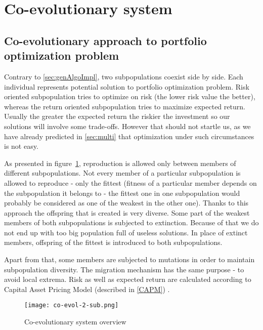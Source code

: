 \section{Co-evolutionary system}
\label{sec:co-evol-sys}

\subsection{Co-evolutionary approach to portfolio optimization problem}

Contrary to \ref{sec:genAlgoImpl}, two subpopulations coexist side by side.
Each individual represents potential solution to portfolio optimization problem.
Risk oriented subpopulation tries to optimize on risk (the lower risk value the better), whereas the return oriented subpopulation tries to maximize expected return.
Usually the greater the expected return the riskier the investment so our solutions will involve some trade-offs.
However that should not startle us, as we have already predicted in \ref{sec:multi} that optimization under such circumstances is not easy.

As presented in figure~\ref{fig:co-evol}, reproduction is allowed only between members of different subpopulations.
Not every member of a particular subpopulation is allowed to reproduce - only the fittest (fitness of a particular member depends on the subpopulation it belongs to - the fittest one
 in one subpopulation would probably be considered as one of the weakest in the other one).
Thanks to this approach the offspring that is created is very diverse. 
Some part of the weakest members of both subpopulations is subjected to extinction.
Because of that we do not end up with too big population full of useless solutions.
In place of extinct members, offspring of the fittest is introduced to both subpopulations.

Apart from that, some members are subjected to mutations in order to maintain subpopulation diversity.
The migration mechanism has the same purpose - to avoid local extrema.
Risk as well as expected return are calculated according to Capital Asset Pricing Model (described in \ref{CAPM}) .


\begin{figure}[ht]  
	    \begin{center}
	      \texttt{[image: co-evol-2-sub.png]}
	    \end{center}
	    \caption{Co-evolutionary system overview} 
	    \label{fig:co-evol}
	  \end{figure}

